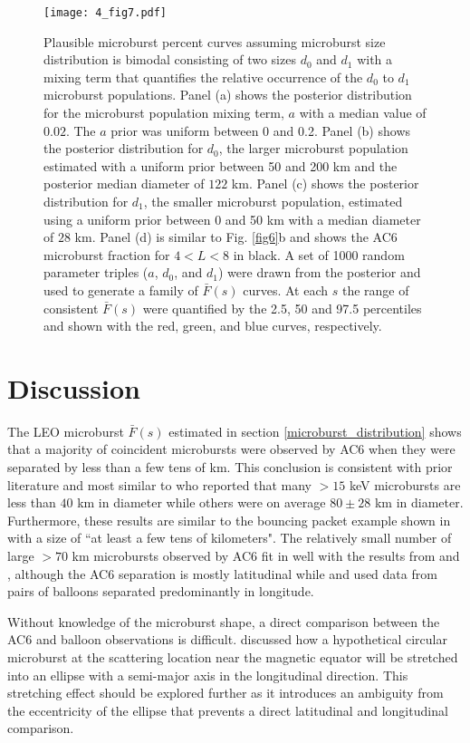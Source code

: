 \begin{figure}
\texttt{[image: 4\_fig7.pdf]}
\caption{Plausible microburst percent curves assuming microburst size distribution is bimodal consisting of two sizes $d_0$ and $d_1$ with a mixing term that quantifies the relative occurrence of the $d_0$ to $d_1$ microburst populations. Panel (a) shows the posterior distribution for the microburst population mixing term, $a$ with a median value of $0.02$. The $a$ prior was uniform between 0 and 0.2. Panel (b) shows the posterior distribution for $d_0$, the larger microburst population estimated with a uniform prior between 50 and 200 km and the posterior median diameter of $122$ km. Panel (c) shows the posterior distribution for $d_1$, the smaller microburst population, estimated using a uniform prior between 0 and 50 km with a median diameter of $28$ km. Panel (d) is similar to Fig. \ref{fig6}b and shows the AC6 microburst fraction for $4 < L < 8$ in black. A set of 1000 random parameter triples ($a$, $d_0$, and $d_1$) were drawn from the posterior and used to generate a family of $\bar{F}(s)$ curves. At each $s$ the range of consistent $\bar{F}(s)$ were quantified by the 2.5, 50 and 97.5 percentiles and shown with the red, green, and blue curves, respectively.} 
\label{fig7}
\end{figure}

\section{Discussion} \label{discussion}
The LEO microburst $\bar{F}(s)$ estimated in section \ref{microburst_distribution} shows that a majority of coincident microbursts were observed by AC6 when they were separated by less than a few tens of km. This conclusion is consistent with prior literature and most similar to \citet{Parks1967} who reported that many $> 15$ keV microbursts are less than $40$ km in diameter while others were on average $80 \pm 28$ km in diameter. Furthermore, these results are similar to the bouncing packet example shown in \citet{Blake1996} with a size of ``at least a few tens of kilometers". The relatively small number of large $> 70$ km microbursts observed by AC6 fit in well with the results from \citet{Barcus1966} and \citet{Brown1965_2}, although the AC6 separation is mostly latitudinal while \citet{Barcus1966} and \citet{Brown1965_2} used data from pairs of balloons separated predominantly in longitude. 

Without knowledge of the microburst shape, a direct comparison between the AC6 and balloon observations is difficult. \citet{Trefall1966} discussed how a hypothetical circular microburst at the scattering location near the magnetic equator will be stretched into an ellipse with a semi-major axis in the longitudinal direction. This stretching effect should be explored further as it introduces an ambiguity from the eccentricity of the ellipse that prevents a direct latitudinal and longitudinal comparison.

